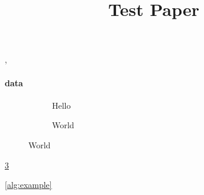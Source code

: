 \documentclass{article}
\begin{document}
\title{Test Paper}
\maketitle

\ie, \eg

\paragraph{data}

\citeauthor{bosshart_p4_2014}

\begin{figure}
  \begin{subfigure}{0.3\linewidth}
    \caption{Hello}
    \label{fig:t1}
  \end{subfigure}
  \begin{subfigure}{0.3\linewidth}
    \caption{World}
    \label{fig:t2}
  \end{subfigure}
\end{figure}

\cref{fig:t2}



\cref{alg:example}

\begin{theorem}
  \label{theorem:abc}
\end{theorem}




\end{document}
